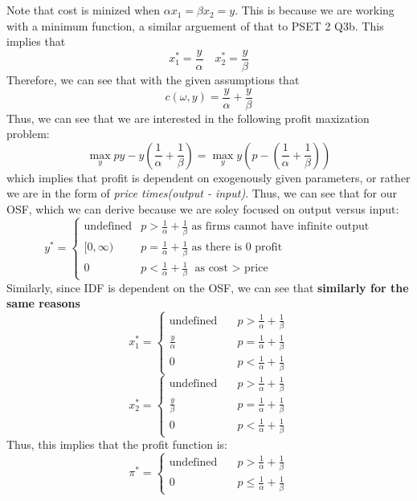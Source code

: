 \documentclass[11pt]{article}
\begin{document}
\section{}
Note that cost is minized when $\alpha x_1  = \beta x_2 = y$. This is because we are working with a minimum function, a similar arguement of that to PSET 2 Q3b. This implies that 
\[
x_1^* = \frac{y}{\alpha} \quad x_2^* = \frac{y}{\beta}
\]
Therefore, we can see that with the given assumptions that 
\[
c(\omega, y) = \frac{y}{\alpha} + \frac{y}{\beta}
\]
Thus, we can see that we are interested in the following profit maxization problem:
\[
\max_y py - y\left(\frac{1}{\alpha} + \frac{1}{\beta}\right) = \max_y y \left( p - \left( \frac{1}{\alpha} + \frac{1}{\beta} \right) \right)
\]
which implies that profit is dependent on exogenously given parameters, or rather we are in the form of \emph{price times(output - input)}. Thus, we can see that for our OSF, which we can derive because we are soley focused on output versus input:
\[y^* = 
\begin{cases}
    \text{undefined} & p > \frac{1}{\alpha} + \frac{1}{\beta} \text{ as firms cannot have infinite output}\\
    [0, \infty) & p = \frac{1}{\alpha} + \frac{1}{\beta} \text{ as there is 0 profit}\\
    0 & p < \frac{1}{\alpha} + \frac{1}{\beta} \text{ as cost $>$ price}
\end{cases}
\]
Similarly, since IDF is dependent on the OSF, we can see that \textbf{similarly for the same reasons}
\[
x_1^* = \begin{cases}
    \text{undefined} &\quad p > \frac{1}{\alpha} + \frac{1}{\beta} \\
    \frac{y}{\alpha} &\quad p = \frac{1}{\alpha} + \frac{1}{\beta} \\
    0 &\quad p < \frac{1}{\alpha} + \frac{1}{\beta}
\end{cases}
\]
\[
x_2^* = \begin{cases}
    \text{undefined} &\quad p > \frac{1}{\alpha} + \frac{1}{\beta} \\
    \frac{y}{\beta}&\quad p = \frac{1}{\alpha} + \frac{1}{\beta} \\
    0 &\quad p < \frac{1}{\alpha} + \frac{1}{\beta}
\end{cases}
\] 
Thus, this implies that the profit function is:
\[
\pi^* = \begin{cases}
    \text{undefined} &\quad p > \frac{1}{\alpha} + \frac{1}{\beta} \\
    0 & \quad p \leq \frac{1}{\alpha} + \frac{1}{\beta}
\end{cases}
\]
\end{document}
